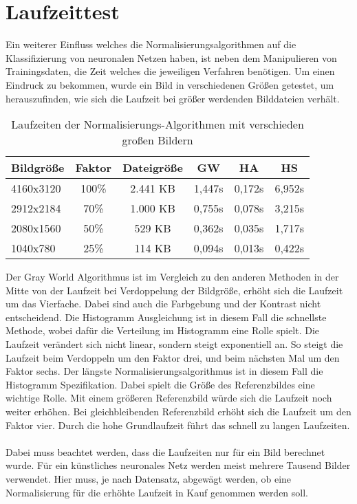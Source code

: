\section{Laufzeittest}
Ein weiterer Einfluss welches die Normalisierungsalgorithmen auf die Klassifizierung von neuronalen Netzen haben, ist neben dem Manipulieren von Trainingsdaten, die Zeit welches die jeweiligen Verfahren benötigen. Um einen Eindruck zu bekommen, wurde ein Bild in verschiedenen Größen getestet, um herauszufinden, wie sich die Laufzeit bei größer werdenden Bilddateien verhält.
\begin{table}
[h]
\caption{Laufzeiten der Normalisierungs-Algorithmen mit verschieden großen Bildern}
\centering
\begin{tabular}{|l|c|c|c|c|c|}
\hline
Bildgröße & Faktor & Dateigröße & GW & HA & HS\\
\hline
4160x3120 & 100\% & 2.441 KB & 1,447s & 0,172s & 6,952s\\
2912x2184 & 70\% & 1.000 KB & 0,755s & 0,078s & 3,215s\\
2080x1560 & 50\% & 529 KB & 0,362s & 0,035s & 1,717s\\
1040x780 & 25\% & 114 KB & 0,094s & 0,013s & 0,422s\\
\hline
\end{tabular}
\end{table}
Der Gray World Algorithmus ist im Vergleich zu den anderen Methoden in der Mitte von der Laufzeit bei Verdoppelung der Bildgröße, erhöht sich die Laufzeit um das Vierfache. Dabei sind auch die Farbgebung und der Kontrast nicht entscheidend. Die Histogramm Ausgleichung ist in diesem Fall die schnellste Methode, wobei dafür die Verteilung im Histogramm eine Rolle spielt. Die Laufzeit verändert sich nicht linear, sondern steigt exponentiell an. So steigt die Laufzeit beim Verdoppeln um den Faktor drei, und beim nächsten Mal um den Faktor sechs. Der längste Normalisierungsalgorithmus ist in diesem Fall die Histogramm Spezifikation. Dabei spielt die Größe des Referenzbildes eine wichtige Rolle. Mit einem größeren Referenzbild würde sich die Laufzeit noch weiter erhöhen. Bei gleichbleibenden Referenzbild erhöht sich die Laufzeit um den Faktor vier. Durch die hohe Grundlaufzeit führt das schnell zu langen Laufzeiten.\\\\
Dabei muss beachtet werden, dass die Laufzeiten nur für ein Bild berechnet wurde. Für ein künstliches neuronales Netz werden meist mehrere Tausend Bilder verwendet. Hier muss, je nach Datensatz, abgewägt werden, ob eine Normalisierung für die erhöhte Laufzeit in Kauf genommen werden soll.  